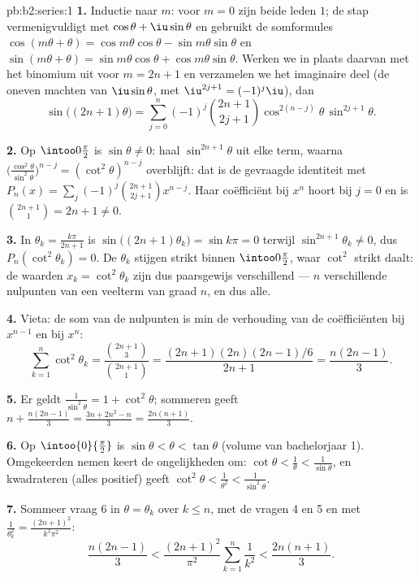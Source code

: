 \begin{solution}{pb:b2:series:1}
\textbf{1.} Inductie naar $m$: voor $m = 0$ zijn beide leden $1$;
de stap vermenigvuldigt met $\cos\theta + \iu\sin\theta$ en
gebruikt de somformules $\cos(m\theta + \theta) = \cos
m\theta\cos\theta - \sin m\theta\sin\theta$ en $\sin(m\theta +
\theta) = \sin m\theta\cos\theta + \cos m\theta\sin\theta$. Werken
we in plaats daarvan met het binomium uit voor $m = 2n+1$ en
verzamelen we het imaginaire deel (de oneven machten van
$\iu\sin\theta$, met $\iu^{2j+1} = (-1)^j\iu$), dan
\[
\sin\bigl((2n{+}1)\theta\bigr) = \sum_{j=0}^{n}(-1)^j
\binom{2n+1}{2j+1}\cos^{2(n-j)}\theta\,\sin^{2j+1}\theta .
\]

\textbf{2.} Op $\intoo0{\frac\pi2}$ is $\sin\theta \neq 0$: haal
$\sin^{2n+1}\theta$ uit elke term, waarna
$\bigl(\frac{\cos^2\theta}{\sin^2\theta}\bigr)^{n-j} =
(\cot^2\theta)^{n-j}$ overblijft: dat is de gevraagde identiteit
met $P_n(x) = \sum_j(-1)^j\binom{2n+1}{2j+1}x^{n-j}$. Haar
coëfficiënt bij $x^n$ hoort bij $j = 0$ en is
$\binom{2n+1}{1} = 2n + 1 \neq 0$.

\textbf{3.} In $\theta_k = \frac{k\pi}{2n+1}$ is
$\sin\bigl((2n{+}1)\theta_k\bigr) = \sin k\pi = 0$ terwijl
$\sin^{2n+1}\theta_k \neq 0$, dus $P_n(\cot^2\theta_k) = 0$. De
$\theta_k$ stijgen strikt binnen $\intoo0{\frac\pi2}$, waar
$\cot^2$ strikt daalt: de waarden $x_k = \cot^2\theta_k$ zijn dus
paarsgewijs verschillend --- $n$ verschillende nulpunten van een
veelterm van graad $n$, en dus alle.

\textbf{4.} Vieta: de som van de nulpunten is min de verhouding van
de coëfficiënten bij $x^{n-1}$ en bij $x^n$:
\[
\sum_{k=1}^{n}\cot^2\theta_k =
\frac{\binom{2n+1}{3}}{\binom{2n+1}{1}}
= \frac{(2n+1)(2n)(2n-1)/6}{2n+1} = \frac{n(2n-1)}{3}.
\]

\textbf{5.} Er geldt $\frac{1}{\sin^2\theta} = 1 + \cot^2\theta$;
sommeren geeft $n + \frac{n(2n-1)}3 = \frac{3n + 2n^2 - n}{3} =
\frac{2n(n+1)}{3}$.

\textbf{6.} Op $\intoo{0}{\frac\pi2}$ is $\sin\theta < \theta <
\tan\theta$ (volume van bachelorjaar 1). Omgekeerden nemen keert de
ongelijkheden om: $\cot\theta < \frac1\theta <
\frac1{\sin\theta}$, en kwadrateren (alles positief) geeft
$\cot^2\theta < \frac1{\theta^2} < \frac1{\sin^2\theta}$.

\textbf{7.} Sommeer vraag 6 in $\theta = \theta_k$ over $k \leq n$,
met de vragen 4 en 5 en met $\frac1{\theta_k^2} =
\frac{(2n+1)^2}{k^2\pi^2}$:
\[
\frac{n(2n-1)}3 < \frac{(2n+1)^2}{\pi^2}\sum_{k=1}^n\frac1{k^2}
< \frac{2n(n+1)}3 .
\]


\end{solution}
